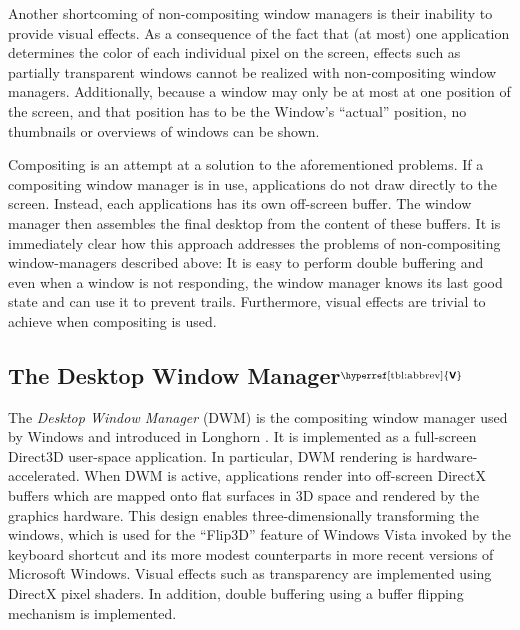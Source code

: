 \documentclass[10pt,twocolumn,a4paper,os=win]{article}
\newcommand{\bs}[1]{\textbf{\sffamily #1}}
\newcommand{\winver}[1]{$^{\text{\hyperref[tbl:abbrev]{\bs{#1}}}}$}
\newcommand{\winsubsection}[2]{\subsection[#1]{#1\winver{#2}}}
\begin{document}
			Another shortcoming of non-compositing window managers is their
			inability to provide visual effects. As a consequence of the fact
			that (at most) one application determines the color of each individual
			pixel on the screen, effects such as partially transparent windows
			cannot be realized with non-compositing window managers. Additionally,
			because a window may only be at most at one position of the screen,
			and that position has to be the Window's \enquote{actual} position,
			no thumbnails or overviews of windows can be shown.

			Compositing is an attempt at a solution to the aforementioned
			problems.  If a compositing window manager is in use, applications
			do not draw directly to the screen. Instead, each applications has
			its own off-screen buffer. The
			window manager then assembles the final
			desktop from the content of these buffers. It is immediately clear how this approach addresses the
			problems of non-compositing window-managers described above: It is
			easy to perform double buffering and even when a window is not
			responding, the window manager knows its last good state and can
			use it to prevent trails. Furthermore, visual effects are trivial
			to achieve when compositing is used. \cite{dwmoverview}

		\winsubsection{The Desktop Window Manager}{V}\label{sec:dwm}
			The \emph{Desktop Window Manager} (DWM) is the compositing window
			manager used by Windows and introduced in Longhorn
			\cite{dwmoverview}.  It is implemented as a full-screen Direct3D
			user-space application. In particular, DWM rendering is
			hardware-accelerated. When DWM is active, applications render into
			off-screen DirectX buffers which are mapped onto flat surfaces in
			3D space and rendered by the graphics hardware. This design enables
			three-dimensionally transforming the windows, which is used for the
			\enquote{Flip3D} feature of Windows Vista invoked by the keyboard
			shortcut  and its more modest counterparts in more
			recent versions of Microsoft Windows. Visual effects such as
			transparency are implemented using DirectX pixel shaders. In addition,
			double buffering using a buffer flipping mechanism is implemented.
			\cite{dwmdirectx}
\end{document}
